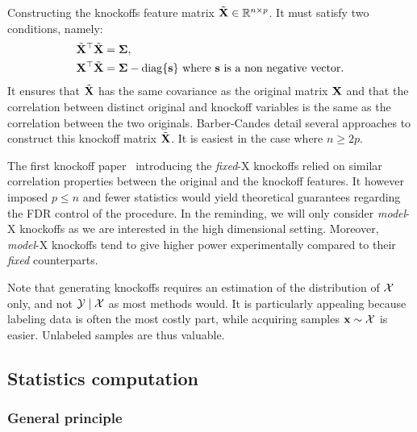 \begin{remark}
    Constructing the knockoffs feature matrix $\tilde{\mathbf{X}} \in \mathbb{R}^{n \times p}$.
    It must satisfy two conditions, namely:
    \begin{align*}
        &{\tilde{\mathbf{X}}}^\top\tilde{\mathbf{X}} = \bm{\Sigma},
        \\
        &\mathbf{X}^\top\tilde{\mathbf{X}} = \bm{\Sigma} - \operatorname*{diag}\{\mathbf{s}\}
        \text{ where } \mathbf{s} \text{ is a non negative vector.}
    \end{align*}
    It ensures that $\tilde{\mathbf{X}}$ has the same covariance as the original matrix $\mathbf{X}$
    and that the correlation between distinct original and knockoff variables is the same as the correlation between the
    two originals.
    Barber-Candes detail several approaches to construct this knockoff matrix $\tilde{\mathbf{X}}$.
    It is easiest in the case where $n \geq 2p$.
\end{remark}
The first knockoff paper~\cite{fixed_x_knockoffs} introducing the \textit{fixed}-X knockoffs relied on similar correlation
properties between the original and the knockoff features.
It however imposed $p \leq n$ and fewer statistics would yield theoretical guarantees regarding the FDR control
of the procedure.
In the reminding, we will only consider \textit{model}-X knockoffs as we are interested in the high dimensional
setting.
Moreover, \textit{model}-X knockoffs tend to give higher power experimentally compared to their \textit{fixed}
counterparts.

Note that generating knockoffs requires an estimation of the distribution of $\mathcal{X}$ only,
and not $\mathcal{Y} \mid \mathcal{X}$ as most methods would.
It is particularly appealing because labeling data is often the most costly part,
while acquiring samples $\mathbf{x} \sim \mathcal{X}$ is easier.
Unlabeled samples are thus valuable.

\subsection{Statistics computation}\label{subsec:ksc}

\subsubsection{General principle}\label{subsubsec:scg}

